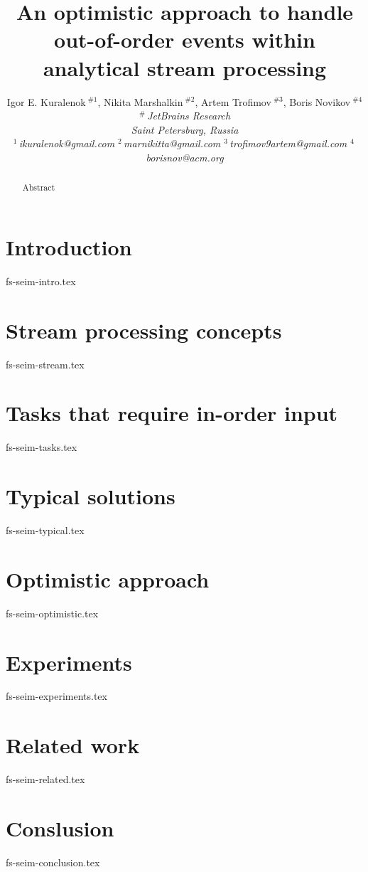 \documentclass[10pt,conference,letterpaper]{IEEEtran}
\title{An optimistic approach to handle out-of-order events within analytical stream processing}
\author{%
{Igor E. Kuralenok{\small $~^{\#1}$}, 
    Nikita Marshalkin{\small $~^{\#2}$},
    Artem Trofimov{\small $~^{\#3}$}, 
        Boris Novikov{\small $~^{\#4}$} }%
\vspace{1.6mm}\\
\fontsize{10}{10}\selectfont\itshape
$^{\#}$\,JetBrains Research\\
Saint Petersburg, Russia\\
\fontsize{9}{9}\selectfont\ttfamily\upshape
%
$^1$\,ikuralenok@gmail.com   %
$^2$\,marnikitta@gmail.com    %
$^3$\,trofimov9artem@gmail.com   %
$^4$\,borisnov@acm.org 
}
\begin{document}
\maketitle
%
\begin{abstract} 
Abstract
\end{abstract}

%
\section {Introduction}
 {fs-seim-intro.tex}

\section{Stream processing concepts}
 {fs-seim-stream.tex}

\section{Tasks that require in-order input}
 {fs-seim-tasks.tex}

\section{Typical solutions}
 {fs-seim-typical.tex}

\section{Optimistic approach}
 {fs-seim-optimistic.tex}

\section{Experiments}
 {fs-seim-experiments.tex}

\section{Related work}
 {fs-seim-related.tex}

\section{Conslusion}
 {fs-seim-conclusion.tex}



\end{document}
